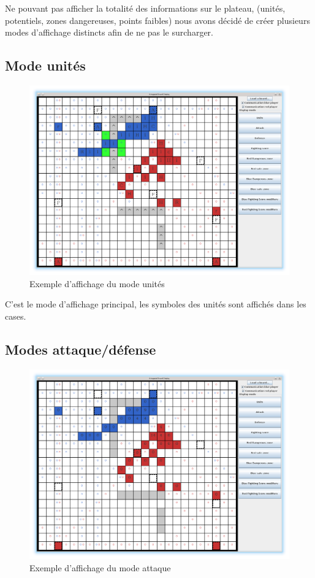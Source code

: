 		Ne pouvant pas afficher la totalité des informations sur le plateau, (unités, potentiels, zones dangereuses, points faibles) nous
		avons décidé de créer plusieurs modes d'affichage distincts afin de ne pas le surcharger.

		\subsection{Mode unités}
			\begin{figure}[!h]
				\centerline{\includegraphics[scale=0.4]{images/screen_units.png}}
				\caption{Exemple d'affichage du mode unités}
				\label{fig:mode_unite}
			\end{figure}

			C'est le mode d'affichage principal, les symboles des unités sont affichés dans les cases.
			\clearpage

		\subsection{Modes attaque/défense}

			\begin{figure}[!h]
				\centerline{\includegraphics[scale=0.4]{images/screen_def.png}}
				\caption{Exemple d'affichage du mode attaque}
			\end{figure}

